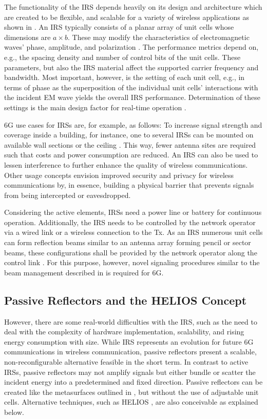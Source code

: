 The functionality of the \ac{IRS} depends heavily on its design and architecture which are created to be flexible, and scalable for a variety of wireless applications as shown in  . An \ac{IRS} typically consists of a planar array of unit cells whose dimensions are $a \times b$. These may modify the characteristics of electromagnetic waves' phase, amplitude, and polarization \cite{wu2019towards}. The performance metrics depend on, e.g., the spacing density and number of control bits of the unit cells. These parameters, but also the IRS material affect the supported carrier frequency and bandwidth. Most important, however, is the setting of each unit cell, e.g., in terms of phase as the superposition of the individual unit cells' interactions with the incident EM wave yields the overall IRS performance. Determination of these settings is the main design factor for real-time operation \cite{IRSdesignandapp, Shen2020ModelingAA, wu2019towards}.

6G use cases for IRSs are, for example, as follows: To increase signal strength and coverage inside a building, for instance, one to several \ac{IRS}s can be mounted on available wall sections or the ceiling \cite{IRSdesignandapp}. This way, fewer antenna sites are required such that costs and power consumption are reduced. An \ac{IRS} can also be used to lessen interference to further enhance the quality of wireless communications. Other usage concepts envision improved security and privacy for wireless communications by, in essence, building a physical barrier that prevents signals from being intercepted or eavesdropped. 

Considering the active elements, IRSs need a power line or battery for continuous operation. Additionally, the IRS needs to be controlled by the network operator via a wired link or a wireless connection to the Tx. As an IRS numerous unit cells can form reflection beams similar to an antenna array forming pencil or sector beams, these configurations shall be provided by the network operator along the control link \cite{IRS_citations2}. For this purpose, however, novel signaling procedures similar to the beam management described in  is required for 6G.
\subsection{Passive Reflectors and the HELIOS Concept} \label{Passive reflectors}
However, there are some real-world difficulties with the \ac{IRS}, such as the need to deal with the complexity of hardware implementation, scalability, and rising energy consumption with size. While \ac{IRS} represents an evolution for future 6G communications in wireless communication, passive reflectors present a scalable, non-reconfigurable alternative feasible in the short term. In contrast to active IRSs, passive reflectors may not amplify signals but either bundle or scatter the incident energy into a predetermined and fixed direction. Passive reflectors can be created like the metasurfaces outlined in  \cite{LiSinghSievenpiper, FangLiChenSunXiaoHeZhou}, but without the use of adjustable unit cells. Alternative techniques, such as HELIOS \cite{Helios}, are also conceivable as explained below.
